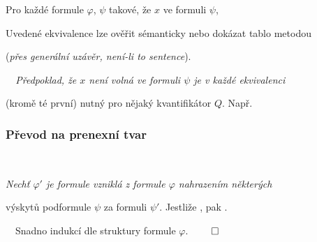     Pro každé formule $\varphi$, $\psi$ takové, že $x$  ve formuli $\psi$,
    \vspace{-1mm}
    
    \vspace{-4mm}
    Uvedené ekvivalence lze ověřit sémanticky nebo dokázat tablo metodou
    \smallskip
    
    (\emph{přes generální uzávěr, není-li to sentence}).
    \bigskip
    
    
    {\it {}\ \ Předpoklad, že $x$ není volná ve formuli $\psi$ je v každé ekvivalenci
    \smallskip
    
    (kromě té první) nutný pro nějaký kvantifikátor $Q$. Např.}
    \vspace{-1mm}
    
    \vspace{-6mm}
    
    
    
    \subsubsection*{Převod na prenexní tvar}
    
    \ \ {\it Nechť $\varphi'$ je formule vzniklá z formule $\varphi$ nahrazením některých
    \smallskip
    
    výskytů podformule $\psi$ za formuli $\psi'$. Jestliže , pak .}
    \medskip
    
    \ \ Snadno indukcí dle struktury formule $\varphi$. $\qed$
    \bigskip
    
